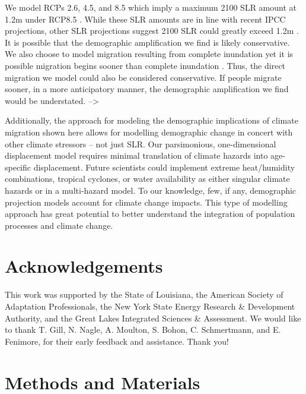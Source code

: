 \documentclass[12pt]{article}
\begin{document}
We model RCPs 2.6, 4.5, and 8.5 which imply a maximum 2100 SLR amount at
1.2m under RCP8.5 \citep{koppProbabilistic21st22nd}. While these SLR
amounts are in line with recent IPCC projections, other SLR projections
suggest 2100 SLR could greatly exceed 1.2m
\citep[\citet{bamber2019ice},\citet{sweetGlobalRegionalSea2017}]{rahmstorfSemiEmpiricalApproachProjecting2007}.
It is possible that the demographic amplification we find is likely
conservative. We also choose to model migration resulting from complete
inundation yet it is possible migration begins sooner than complete
inundation \citep{hauer2020sea}. Thus, the direct migration we model
could also be considered conservative. If people migrate sooner, in a
more anticipatory manner, the demographic amplification we find would be
understated. --\textgreater{}

Additionally, the approach for modeling the demographic implications of
climate migration shown here allows for modelling demographic change in
concert with other climate stressors -- not just SLR. Our parsimonious,
one-dimensional displacement model requires minimal translation of
climate hazards into age-specific displacement. Future scientists could
implement extreme heat/humidity combinations, tropical cyclones, or
water availability as either singular climate hazards or in a
multi-hazard model. To our knowledge, few, if any, demographic
projection models account for climate change impacts. This type of
modelling approach has great potential to better understand the
integration of population processes and climate change.

\hypertarget{acknowledgements}{%
\section{Acknowledgements}\label{acknowledgements}}

This work was supported by the State of Louisiana, the American Society
of Adaptation Professionals, the New York State Energy Research \&
Development Authority, and the Great Lakes Integrated Sciences \&
Assessment. We would like to thank T. Gill, N. Nagle, A. Moulton, S.
Bohon, C. Schmertmann, and E. Fenimore, for their early feedback and
assistance. Thank you!

\hypertarget{methods-and-materials}{%
\section{Methods and Materials}\label{methods-and-materials}}
\end{document}
